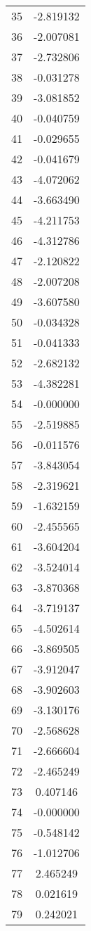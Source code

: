 \documentclass[12pt]{article}
\begin{document}
\begin{longtable}{@{}cc@{}}
35 & -2.819132 \\
36 & -2.007081 \\
37 & -2.732806 \\
38 & -0.031278 \\
39 & -3.081852 \\
40 & -0.040759 \\
41 & -0.029655 \\
42 & -0.041679 \\
43 & -4.072062 \\
44 & -3.663490 \\
45 & -4.211753 \\
46 & -4.312786 \\
47 & -2.120822 \\
48 & -2.007208 \\
49 & -3.607580 \\
50 & -0.034328 \\
51 & -0.041333 \\
52 & -2.682132 \\
53 & -4.382281 \\
54 & -0.000000 \\
55 & -2.519885 \\
56 & -0.011576 \\
57 & -3.843054 \\
58 & -2.319621 \\
59 & -1.632159 \\
60 & -2.455565 \\
61 & -3.604204 \\
62 & -3.524014 \\
63 & -3.870368 \\
64 & -3.719137 \\
65 & -4.502614 \\
66 & -3.869505 \\
67 & -3.912047 \\
68 & -3.902603 \\
69 & -3.130176 \\
70 & -2.568628 \\
71 & -2.666604 \\
72 & -2.465249 \\
73 & 0.407146 \\
74 & -0.000000 \\
75 & -0.548142 \\
76 & -1.012706 \\
77 & 2.465249 \\
78 & 0.021619 \\
79 & 0.242021 \\

\end{longtable}
\end{document}
